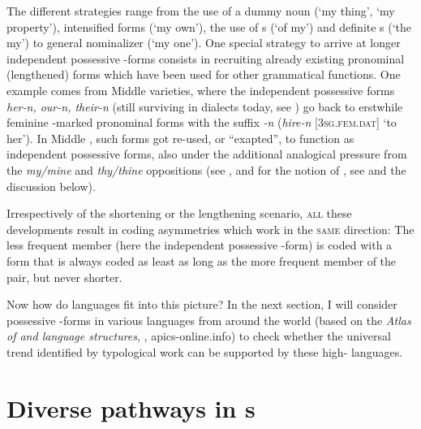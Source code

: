 \documentclass[output=paper]{langsci/langscibook}
\begin{document}
The different strategies range from the use of a dummy noun (‘my thing’, ‘my property’), intensified  forms (‘my own’), the use of s (‘of my’) and definite s (‘the my’) to general nominalizer (‘my one’). One special strategy to arrive at longer independent possessive -forms consists in recruiting already existing pronominal (lengthened) forms which have been used for other grammatical functions. One example comes from Middle  varieties, where the independent possessive forms \textit{her-n, our-n, their-n} (still surviving in  dialects today, see \citealt{KortmannLunkenheimer2013}) go back to erstwhile feminine  -marked pronominal forms with the suffix \textit{{}-n} (\textit{hire-n} [\textsc{3sg.fem.dat}] ‘to her’). In Middle , such  forms got re-used, or “exapted”, to function as independent possessive forms, also under the additional analogical pressure from the \textit{my/mine} and \textit{thy/thine} oppositions (see \citealt{Allen2002}, and for the notion of , see \citealt{Lass1990,Lass2017,NordeVandeVelde2016} and the discussion below). 

Irrespectively of the shortening or the lengthening scenario, \textsc{all} these developments result in coding asymmetries which work in the \textsc{same} direction: The less frequent member (here the independent possessive -form) is coded with a form that is always coded as least as long as the more frequent member of the pair, but never shorter.

Now how do  languages fit into this picture? In the next section, I will consider possessive -forms in various  languages from around the world (based on the \textit{Atlas of  and  language structures}, \citealt{MichaelisEtAl2013}, apics-online.info) to check whether the universal trend identified by typological work can be supported by these high- languages.

\section{Diverse pathways in s}\label{sec:michaelis:4}
\end{document}
